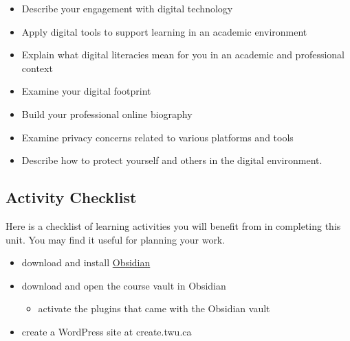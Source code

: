 \documentclass[
]{book}
\providecommand{\tightlist}{%
  \setlength{\itemsep}{0pt}\setlength{\parskip}{0pt}}
\theoremstyle{definition}
\theoremstyle{definition}
\theoremstyle{definition}
\theoremstyle{definition}
\theoremstyle{remark}
\begin{document}
\begin{itemize}
\tightlist
\item
  Describe your engagement with digital technology
\item
  Apply digital tools to support learning in an academic environment
\item
  Explain what digital literacies mean for you in an academic and professional context
\item
  Examine your digital footprint
\item
  Build your professional online biography
\item
  Examine privacy concerns related to various platforms and tools
\item
  Describe how to protect yourself and others in the digital environment.
\end{itemize}

\hypertarget{activity-checklist}{%
\subsection*{Activity Checklist}\label{activity-checklist}}

Here is a checklist of learning activities you will benefit from in completing this unit. You may find it useful for planning your work.

\begin{reflect}
\begin{itemize}
\tightlist
\item
  download and install \href{https://obsidian.md}{Obsidian}
\item
  download and open the course vault in Obsidian

  \begin{itemize}
  \tightlist
  \item
    activate the plugins that came with the Obsidian vault
  \end{itemize}
\item
  create a WordPress site at create.twu.ca
\end{itemize}
\end{reflect}
\end{document}
